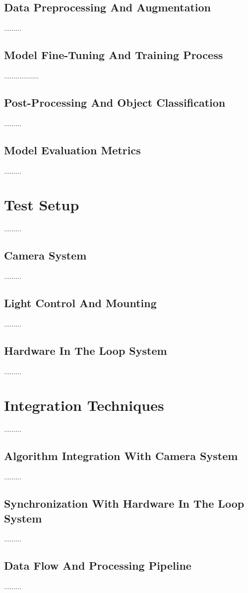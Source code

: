 \subsection{Data Preprocessing And Augmentation}
.........
\subsection{Model Fine-Tuning And Training Process}
..................
\subsection{Post-Processing And Object Classification}
.........
\subsection{Model Evaluation Metrics}
.........
\section{Test Setup}
.........
\subsection{Camera System}
.........
\subsection{Light Control And Mounting}
.........
\subsection{Hardware In The Loop System}
.........
\section{Integration Techniques}
.........
\subsection{Algorithm Integration With Camera System}
.........
\subsection{Synchronization With Hardware In The Loop System}
.........
\subsection{Data Flow And Processing Pipeline}
.........
